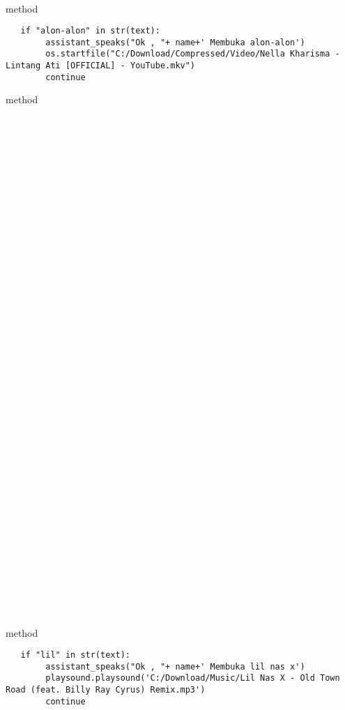 \\
\\
\\
\\
\\
\\
\\
\\
\\
\\
\\
 method 
\begin{lstlisting}
   if "alon-alon" in str(text):
        assistant_speaks("Ok , "+ name+' Membuka alon-alon')
        os.startfile("C:/Download/Compressed/Video/Nella Kharisma - Lintang Ati [OFFICIAL] - YouTube.mkv")
        continue
\end{lstlisting}
 method 
\\
\\
\\
\\
\\
\\
\\
\\
\\
\\
\\
\\
\\
\\
\\
\\
\\
\\
\\
\\
\\
\\
\\
\\
\\
\\
\\
\\
\\
\\
\\
\\
\\
\\
\\
\\
\\
\\
\\
 method 
\begin{lstlisting}
   if "lil" in str(text):
        assistant_speaks("Ok , "+ name+' Membuka lil nas x')
        playsound.playsound('C:/Download/Music/Lil Nas X - Old Town Road (feat. Billy Ray Cyrus) Remix.mp3')
        continue
       
\end{lstlisting}
